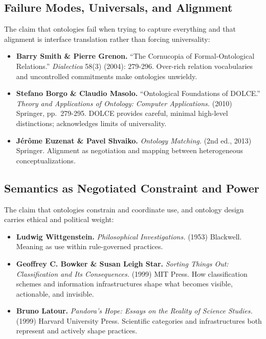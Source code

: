 \documentclass[
  openright]{book}
\begin{document}
\subsection{Failure Modes, Universals, and
Alignment}\label{failure-modes-universals-and-alignment}

The claim that ontologies fail when trying to capture everything and
that alignment is interface translation rather than forcing
universality:

\begin{itemize}
\item
  \textbf{Barry Smith \& Pierre Grenon.} ``The Cornucopia of
  Formal-Ontological Relations.'' \emph{Dialectica} 58(3) (2004):
  279-296. Over-rich relation vocabularies and uncontrolled commitments
  make ontologies unwieldy.
\item
  \textbf{Stefano Borgo \& Claudio Masolo.} ``Ontological Foundations of
  DOLCE.'' \emph{Theory and Applications of Ontology: Computer
  Applications.} (2010) Springer, pp.~279-295. DOLCE provides careful,
  minimal high-level distinctions; acknowledges limits of universality.
\item
  \textbf{Jérôme Euzenat \& Pavel Shvaiko.} \emph{Ontology Matching.}
  (2nd ed., 2013) Springer. Alignment as negotiation and mapping between
  heterogeneous conceptualizations.
\end{itemize}

\subsection{Semantics as Negotiated Constraint and
Power}\label{semantics-as-negotiated-constraint-and-power}

The claim that ontologies constrain and coordinate use, and ontology
design carries ethical and political weight:

\begin{itemize}
\item
  \textbf{Ludwig Wittgenstein.} \emph{Philosophical Investigations.}
  (1953) Blackwell. Meaning as use within rule-governed practices.
\item
  \textbf{Geoffrey C. Bowker \& Susan Leigh Star.} \emph{Sorting Things
  Out: Classification and Its Consequences.} (1999) MIT Press. How
  classification schemes and information infrastructures shape what
  becomes visible, actionable, and invisible.
\item
  \textbf{Bruno Latour.} \emph{Pandora's Hope: Essays on the Reality of
  Science Studies.} (1999) Harvard University Press. Scientific
  categories and infrastructures both represent and actively shape
  practices.
\end{itemize}
\end{document}
